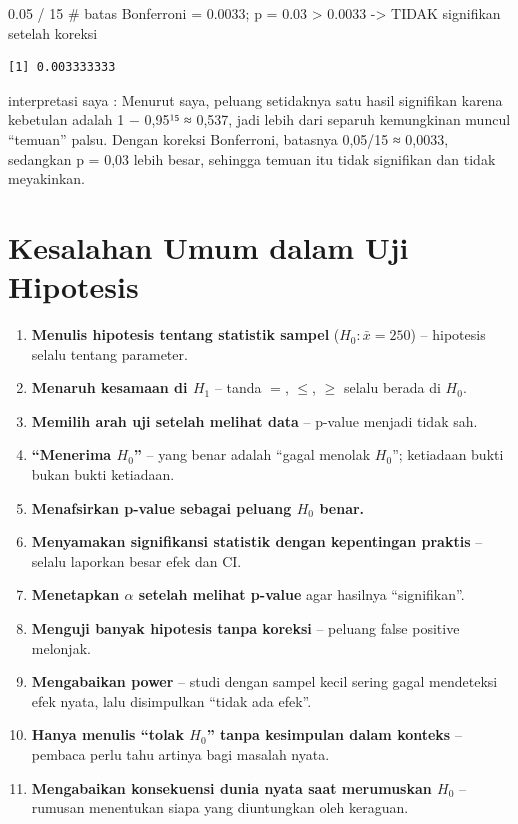 \documentclass[
  indonesian,
  letterpaper,
]{book}
\newenvironment{Shaded}{\begin{snugshade}}{\end{snugshade}}
\newcommand{\CommentTok}[1]{\textcolor[rgb]{0.37,0.37,0.37}{#1}}
\newcommand{\DecValTok}[1]{\textcolor[rgb]{0.68,0.00,0.00}{#1}}
\newcommand{\FloatTok}[1]{\textcolor[rgb]{0.68,0.00,0.00}{#1}}
\newcommand{\SpecialCharTok}[1]{\textcolor[rgb]{0.37,0.37,0.37}{#1}}
\providecommand{\tightlist}{%
  \setlength{\itemsep}{0pt}\setlength{\parskip}{0pt}}
\begin{document}
\begin{Shaded}
\begin{Highlighting}[]
\FloatTok{0.05} \SpecialCharTok{/} \DecValTok{15}     \CommentTok{\# batas Bonferroni = 0.0033; p = 0.03 \textgreater{} 0.0033 {-}\textgreater{} TIDAK signifikan setelah koreksi}
\end{Highlighting}
\end{Shaded}

\begin{verbatim}
[1] 0.003333333
\end{verbatim}

interpretasi saya : Menurut saya, peluang setidaknya satu hasil
signifikan karena kebetulan adalah 1 − 0,95¹⁵ ≈ 0,537, jadi lebih dari
separuh kemungkinan muncul ``temuan'' palsu. Dengan koreksi Bonferroni,
batasnya 0,05/15 ≈ 0,0033, sedangkan p = 0,03 lebih besar, sehingga
temuan itu tidak signifikan dan tidak meyakinkan.

\section{Kesalahan Umum dalam Uji
Hipotesis}\label{kesalahan-umum-dalam-uji-hipotesis}

\begin{enumerate}
\def\labelenumi{\arabic{enumi}.}
\tightlist
\item
  \textbf{Menulis hipotesis tentang statistik sampel}
  (\(H_0: \bar{x} = 250\)) -- hipotesis selalu tentang parameter.
\item
  \textbf{Menaruh kesamaan di \(H_1\)} -- tanda \(=\), \(\le\), \(\ge\)
  selalu berada di \(H_0\).
\item
  \textbf{Memilih arah uji setelah melihat data} -- p-value menjadi
  tidak sah.
\item
  \textbf{``Menerima \(H_0\)''} -- yang benar adalah ``gagal menolak
  \(H_0\)''; ketiadaan bukti bukan bukti ketiadaan.
\item
  \textbf{Menafsirkan p-value sebagai peluang \(H_0\) benar.}
\item
  \textbf{Menyamakan signifikansi statistik dengan kepentingan praktis}
  -- selalu laporkan besar efek dan CI.
\item
  \textbf{Menetapkan \(\alpha\) setelah melihat p-value} agar hasilnya
  ``signifikan''.
\item
  \textbf{Menguji banyak hipotesis tanpa koreksi} -- peluang false
  positive melonjak.
\item
  \textbf{Mengabaikan power} -- studi dengan sampel kecil sering gagal
  mendeteksi efek nyata, lalu disimpulkan ``tidak ada efek''.
\item
  \textbf{Hanya menulis ``tolak \(H_0\)'' tanpa kesimpulan dalam
  konteks} -- pembaca perlu tahu artinya bagi masalah nyata.
\item
  \textbf{Mengabaikan konsekuensi dunia nyata saat merumuskan \(H_0\)}
  -- rumusan menentukan siapa yang diuntungkan oleh keraguan.
\end{enumerate}
\end{document}
